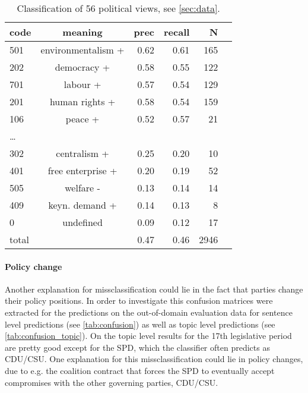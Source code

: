 \documentclass[11pt]{article}
\begin{document}
\begin{table}
\caption{
\label{tab:results_avg_political_view}
Classification of 56 political views, see \autoref{sec:data}.
}
\begin{center}
\footnotesize
\begin{tabular}{lcrrrr}
code & meaning  &      prec    &recall & N\\
\hline\hline
%
       501  & environmentalism + &      0.62   &   0.61 &      165\\
        202 &   democracy + &   0.58  &    0.55   &      122\\
        701    & labour +&  0.57  &    0.54   &   129\\
                201    &human rights +  & 0.58   &   0.54   &      159\\
         106   & peace + & 0.52&      0.57   &       21\\
\dots\\
        302     &centralism + & 0.25     & 0.20  &          10\\
        401    &  free enterprise + &0.20    &  0.19    &       52\\
        505    &welfare - &  0.13   &   0.14   &      14\\
        409    & keyn. demand +&  0.14  &      0.13   &      8\\
            0    & undefined &  0.09  &    0.12   &    17\\
            \hline
 total  &  &  0.47    &  0.46 &    2946\\
%
\end{tabular}
\end{center}
\end{table}

\paragraph{Policy change}
Another explanation for missclassification could lie in the fact that parties change their policy positions. In order to investigate this confusion matrices were extracted for the predictions on the out-of-domain evaluation data for sentence level predictions (see \autoref{tab:confusion}) as well as topic level predictions (see \autoref{tab:confusion_topic}). On the topic level results for the 17th legislative period are pretty good except for the SPD, which the classifier often predicts as CDU/CSU. One explanation for this missclassification could lie in policy changes, due to e.g. the coalition contract that forces the SPD to eventually accept compromises with the other governing parties, CDU/CSU. \\
\end{document}
